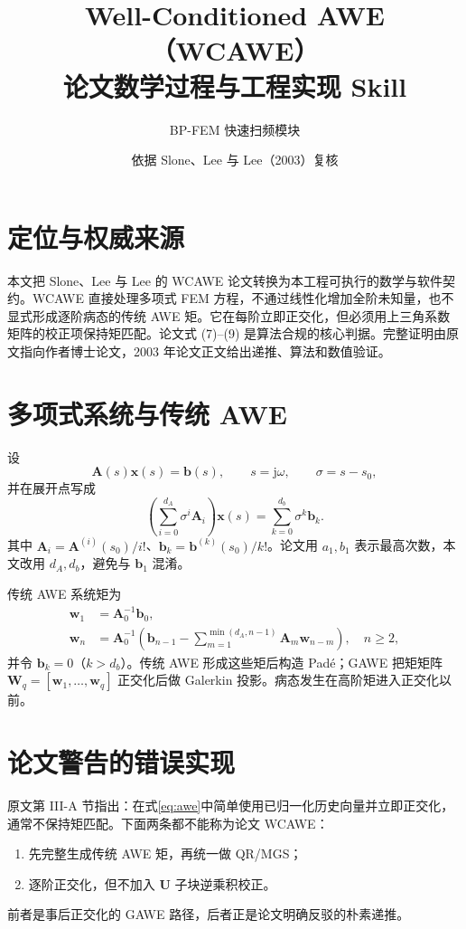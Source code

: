 \documentclass[11pt,a4paper]{ctexart}
\title{Well-Conditioned AWE（WCAWE）\\论文数学过程与工程实现 Skill}
\author{BP-FEM 快速扫频模块}
\date{依据 Slone、Lee 与 Lee（2003）复核}
\newcommand{\A}{\bm A}
\newcommand{\bvec}{\bm b}
\newcommand{\xvec}{\bm x}
\newcommand{\wvec}{\bm w}
\newcommand{\Umat}{\bm U}
\newcommand{\Wmat}{\bm W}
\begin{document}
\maketitle
\tableofcontents

\section{定位与权威来源}
本文把 Slone、Lee 与 Lee 的 WCAWE 论文\cite{Slone2003}转换为本工程可执行的数学与软件契约。WCAWE 直接处理多项式 FEM 方程，不通过线性化增加全阶未知量，也不显式形成逐阶病态的传统 AWE 矩。它在每阶立即正交化，但必须用上三角系数矩阵的校正项保持矩匹配。论文式 (7)--(9) 是算法合规的核心判据。完整证明由原文指向作者博士论文，2003 年论文正文给出递推、算法和数值验证。

\section{多项式系统与传统 AWE}
设
\begin{equation}
\A(s)\xvec(s)=\bvec(s),\qquad s=\mathrm j\omega,\qquad \sigma=s-s_0,
\end{equation}
并在展开点写成
\begin{equation}
\left(\sum_{i=0}^{d_A}\sigma^i\A_i\right)\xvec(s)
=\sum_{k=0}^{d_b}\sigma^k\bvec_k.
\label{eq:poly}
\end{equation}
其中 $\A_i=\A^{(i)}(s_0)/i!$、$\bvec_k=\bvec^{(k)}(s_0)/k!$。论文用 $a_1,b_1$ 表示最高次数，本文改用 $d_A,d_b$，避免与 $\bvec_1$ 混淆。

传统 AWE 系统矩为
\begin{align}
\wvec_1&=\A_0^{-1}\bvec_0,\\
\wvec_n&=\A_0^{-1}\left(\bvec_{n-1}-
\sum_{m=1}^{\min(d_A,n-1)}\A_m\wvec_{n-m}\right),\quad n\ge2,
\label{eq:awe}
\end{align}
并令 $\bvec_k=0$（$k>d_b$）。传统 AWE 形成这些矩后构造 Pad\'e；GAWE 把矩矩阵 $\Wmat_q=[\wvec_1,\ldots,\wvec_q]$ 正交化后做 Galerkin 投影。病态发生在高阶矩进入正交化以前。

\section{论文警告的错误实现}
原文第 III-A 节指出：在式\eqref{eq:awe}中简单使用已归一化历史向量并立即正交化，通常不保持矩匹配。下面两条都不能称为论文 WCAWE：
\begin{enumerate}
\item 先完整生成传统 AWE 矩，再统一做 QR/MGS；
\item 逐阶正交化，但不加入 $\Umat$ 子块逆乘积校正。
\end{enumerate}
前者是事后正交化的 GAWE 路径，后者正是论文明确反驳的朴素递推。
\end{document}
